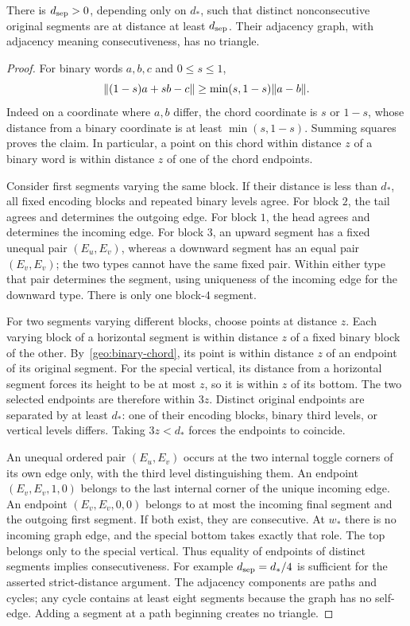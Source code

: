 \begin{lemma}\label{geo:separation}
There is $d_{\rm sep}>0$, depending only on $d_*$, such that distinct
nonconsecutive original segments are at distance at least $d_{\rm sep}$.
Their adjacency graph, with adjacency meaning consecutiveness, has no
triangle.
\end{lemma}
\begin{proof}
For binary words $a,b,c$ and $0\le s\le1$,
\begin{equation}\label{geo:binary-chord}
 \lVert (1-s)a+sb-c\rVert\ge\min(s,1-s)\lVert a-b\rVert.
\end{equation}
Indeed on a coordinate where $a,b$ differ, the chord coordinate is $s$
or $1-s$, whose distance from a binary coordinate is at least
$\min(s,1-s)$. Summing squares proves the claim. In particular, a
point on this chord within distance $z$ of a binary word is within
distance $z$ of one of the chord endpoints.

Consider first segments varying the same block. If their distance is
less than $d_*$, all fixed encoding blocks and repeated binary levels
agree. For block $2$, the tail agrees and determines the outgoing
edge. For block $1$, the head agrees and determines the incoming edge.
For block $3$, an upward segment has a fixed unequal pair $(E_u,E_v)$,
whereas a downward segment has an equal pair $(E_v,E_v)$; the two types
cannot have the same fixed pair. Within either type that pair determines
the segment, using uniqueness of the incoming edge for the downward
type. There is only one block-$4$ segment.

For two segments varying different blocks, choose points at distance
$z$. Each varying block of a horizontal segment is within distance $z$
of a fixed binary block of the other. By~\eqref{geo:binary-chord}, its
point is within distance $z$ of an endpoint of its original segment.
For the special vertical, its distance from a horizontal segment forces
its height to be at most $z$, so it is within $z$ of its bottom. The
two selected endpoints are therefore within $3z$. Distinct original
endpoints are separated by at least $d_*$: one of their encoding blocks,
binary third levels, or vertical levels differs. Taking $3z<d_*$ forces
the endpoints to coincide.

An unequal ordered pair $(E_u,E_v)$ occurs at the two internal toggle
corners of its own edge only, with the third level distinguishing them.
An endpoint $(E_v,E_v,1,0)$ belongs to the last internal corner of the
unique incoming edge. An endpoint $(E_v,E_v,0,0)$ belongs to at most
the incoming final segment and the outgoing first segment. If both
exist, they are consecutive. At $w_*$ there is no incoming graph edge,
and the special bottom takes exactly that role. The top belongs only
to the special vertical. Thus equality of endpoints of distinct
segments implies consecutiveness. For example $d_{\rm sep}=d_*/4$
is sufficient for the asserted strict-distance argument. The adjacency
components are paths and cycles; any cycle contains at least eight
segments because the graph has no self-edge. Adding a segment at a
path beginning creates no triangle.
\end{proof}

